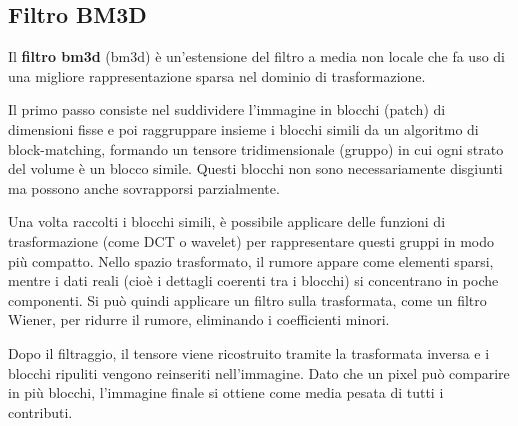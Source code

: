 \documentclass[../main.tex]{subfiles}
\begin{document}
\subsection{Filtro BM3D}

Il \textbf{filtro \acrshort{bm3d}} (\acrlong{bm3d}) è un'estensione del filtro a media non locale che fa uso di una migliore rappresentazione sparsa nel dominio di trasformazione.\cite{manjon_2008}

Il primo passo consiste nel suddividere l’immagine in blocchi (patch) di dimensioni fisse e poi raggruppare insieme i blocchi simili da un algoritmo di block-matching, formando un tensore tridimensionale (gruppo) in cui ogni strato del volume è un blocco simile. Questi blocchi non sono necessariamente disgiunti ma possono anche sovrapporsi parzialmente.

Una volta raccolti i blocchi simili, è possibile applicare delle funzioni di trasformazione (come DCT o wavelet) per rappresentare questi gruppi in modo più compatto. Nello spazio trasformato, il rumore appare come elementi sparsi, mentre i dati reali (cioè i dettagli coerenti tra i blocchi) si concentrano in poche componenti. Si può quindi applicare un filtro sulla trasformata, come un filtro Wiener, per ridurre il rumore, eliminando i coefficienti minori.\cite{maggioni_2013}

Dopo il filtraggio, il tensore viene ricostruito tramite la trasformata inversa e i blocchi ripuliti vengono reinseriti nell’immagine. Dato che un pixel può comparire in più blocchi, l’immagine finale si ottiene come media pesata di tutti i contributi.\cite{dabov_2007}
\end{document}
